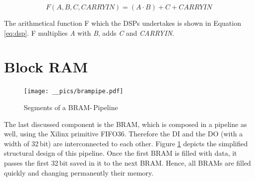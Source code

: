 \begin{equation}
F(A, B, C, CARRYIN) = (A \cdot B) + C + CARRYIN
\label{eq:dsp}
\end{equation}

The arithmetical function F which the \acp{DSP} undertakes is shown in Equation \ref{eq:dsp}. F multiplies \textit{A} with \textit{B}, adds \textit{C} and \textit{CARRYIN}.


\section{Block RAM}
\label{sec:bram}

\begin{figure}[h]
		\texttt{[image: \_\_pics/brampipe.pdf]}
		\caption{Segments of a BRAM-\,Pipeline}
		\label{pic:brampipe}	
	\end{figure} 

The last discussed component is the \ac{BRAM}, which is composed in a pipeline as well, using the Xilinx primitive \ac{FIFO36}. Therefore the \acf{DI} and the \acf{DO} (with a width of 32\,bit) are interconnected to each other. Figure \ref{pic:brampipe} depicts the simplified structural design of this pipeline. Once the first \ac{BRAM} is filled with data, it passes the first 32\,bit saved in it to the next \ac{BRAM}. Hence, all \acp{BRAM} are filled quickly and changing permanently their memory.

